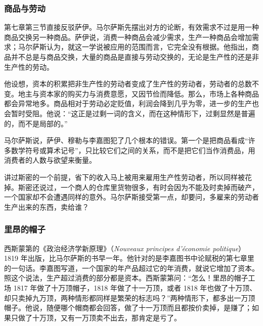 \subsubsection{商品与劳动}
第七章第三节直接反驳萨伊。马尔萨斯先摆出对方的论断，有效需求不过是用一种商品交换另一种商品\cite{malthus1820}。萨伊说，消费一种商品会减少需求，生产一种商品会增加需求；马尔萨斯认为，就这一学说被应用的范围而言，它完全没有根据\cite{malthus1820}。他指出，商品并不总是与商品交换，大量的商品是直接与劳动交换的，无论是生产性的还是非生产性的劳动\cite{malthus1820}。

他设想，资本的积累把非生产性的劳动者变成了生产性的劳动者，劳动者的总数不变。地主与资本家的购买力与消费意愿，又因节俭而降低。那么，市场上各种商品都会异常地多。商品相对于劳动必定贬值，利润会降到几乎为零，进一步的生产也会暂时受阻\cite{malthus1820}。他说：“这正是过剩一词的含义，而在这种情形下，过剩显然是普遍的，而不是局部的。”\cite{malthus1820}

马尔萨斯说，萨伊、穆勒与李嘉图犯了几个根本的错误。第一个是把商品看成“许多数学符号或算术记号”，只比较它们之间的关系，而不是把它们当作消费品，用消费者的人数与欲望来衡量\cite{malthus1820}。

讲过斯密的一个前提，省下的收入马上被用来雇用生产性劳动者，所以同样被花掉。斯密还说过，一个商人的仓库里货物很多，有时会因为不能及时卖掉而破产，一个国家却不会遭遇同样的意外\cite{smith1776}。马尔萨斯接受第一点，却要问，多雇来的劳动者生产出来的东西，卖给谁？

\subsubsection{里昂的帽子}
西斯蒙第的《政治经济学新原理》（\emph{Nouveaux principes d'économie politique}）1819 年出版，比马尔萨斯的书早一年。他针对的是李嘉图书中论赋税的第七章里的一句话。李嘉图写道，一个国家的年产品超过它的年消费，就说它增加了资本\cite{ricardo1817}。照这个说法，生产超过消费的部分都是资本。西斯蒙第问：“怎么！里昂的帽子工场 1817 年做了十万顶帽子，1818 年做了十一万顶，或者 1818 年也做了十万顶、却只卖掉九万顶，两种情形都同样是繁荣的标志吗？”\cite{sismondi1819}两种情形下，都多出一万顶帽子。他说，随便哪个帽商都会回答，做了十一万顶而且都按价卖掉，是赚了；如果只做了十万顶，又有一万顶卖不出去，那肯定是亏了\cite{sismondi1819}。

